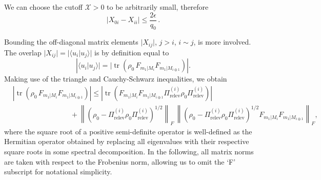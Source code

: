 We can choose the cutoff $\mathcal{X}>0$ to be arbitrarily small, therefore
\begin{equation}
\vert X_{0i} - X_{ii} \vert \leq \frac{2\epsilon}{q_0}\,.
\end{equation}

Bounding the off-diagonal matrix elements $\vert X_{ij}\vert$, $j>i$, $i \sim j$, is more involved. The overlap $\vert X_{ij} \vert = \vert \langle u_i \vert u_j \rangle \vert$ is by definition equal to
\begin{equation}
\left| \langle u_i \vert u_j \rangle \vert = \vert \operatorname{tr}\left(\rho_0 \, F_{m_1\vert M_i} F_{m_1\vert M_{i\oplus 1}}\right)\right|.
\end{equation}
Making use of the triangle and Cauchy-Schwarz inequalities, we obtain
\doublespacing
\begin{equation}
\label{eqn:initialbound}
\begin{split}
& \left| \operatorname{tr}\left(\rho_0 \, F_{m_1\vert M_i} F_{m_1\vert M_{i\oplus 1}}\right) \right| \leq  \left| \operatorname{tr}\left(F_{m_1\vert M_i} F_{m_1\vert M_{i \oplus 1}}\Pi_{\text{relev}}^{(i)}\rho_0\Pi_{\text{relev}}^{(i)}\right)\right| \\ & \hspace{8em} + \left\|\left(\rho_0-\Pi_{\text{relev}}^{(i)}\rho_0\Pi_{\text{relev}}^{(i)}\right)^{1/2}\right\|_F\,\left\|\left(\rho_0-\Pi_{\text{relev}}^{(i)}\rho_0\Pi_{\text{relev}}^{(i)}\right)^{1/2} F_{m_1\vert M_i} F_{m_1\vert M_{i\oplus 1}}\right\|_F,
\end{split}
\end{equation}
\onehalfspacing
where the square root of a positive semi-definite operator is well-defined as the Hermitian operator obtained by replacing all eigenvalues with their respective square roots in some spectral decomposition. In the following, all matrix norms are taken with respect to the Frobenius norm, allowing us to omit the `F' subscript for notational simplicity.

